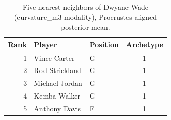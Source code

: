 \begin{table}[htbp]
  \centering\small
  \begin{tabular}{rllc}
    \toprule
    Rank & Player & Position & Archetype \\
    \midrule
    1 & Vince Carter & G & 1 \\
    2 & Rod Strickland & G & 1 \\
    3 & Michael Jordan & G & 1 \\
    4 & Kemba Walker & G & 1 \\
    5 & Anthony Davis & F & 1 \\
    \bottomrule
  \end{tabular}
  \caption{Five nearest neighbors of Dwyane Wade (curvature_m3 modality), Procrustes-aligned posterior mean.}
  \label{tab:Dwyane_Wade_neighbors_curvature_m3}
\end{table}

